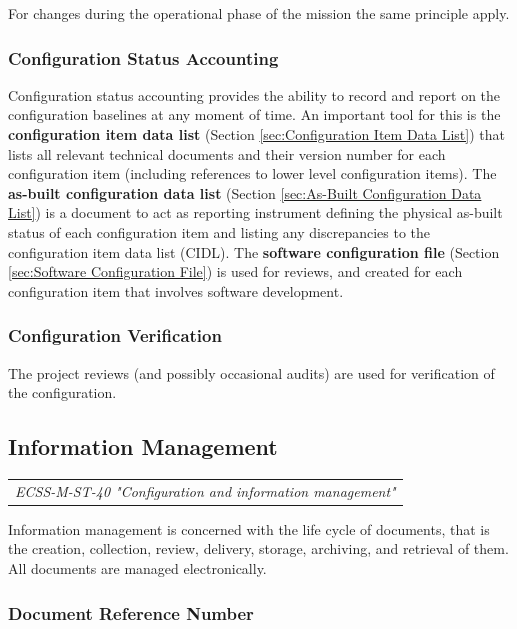 For changes during the operational phase of the mission the same principle apply.

\subsubsection{Configuration Status Accounting}

Configuration status accounting provides the ability to record and report on the configuration baselines at any moment of time. An important tool for this is the \textbf{configuration item data list} (Section \ref{sec:Configuration Item Data List}) that lists all relevant technical documents and their version number for each configuration item (including references to lower level configuration items). The \textbf{as-built configuration data list} (Section \ref{sec:As-Built Configuration Data List}) is a document to act as reporting instrument defining the physical as-built status of each configuration item and listing any discrepancies to the configuration item data list (CIDL). The \textbf{software configuration file} (Section \ref{sec:Software Configuration File}) is used for reviews, and created for each configuration item that involves software development.

\subsubsection{Configuration Verification}

The project reviews (and possibly occasional audits) are used for verification of the configuration.

\subsection{Information Management}

\begin{tabular}{l}
\textit{ECSS-M-ST-40 "Configuration and information management" \cite{ECSS-M-ST-40}}
\end{tabular}

Information management is concerned with the life cycle of documents, that is the creation, collection, review, delivery, storage, archiving, and retrieval of them. All documents are managed electronically.

\subsubsection{Document Reference Number}

